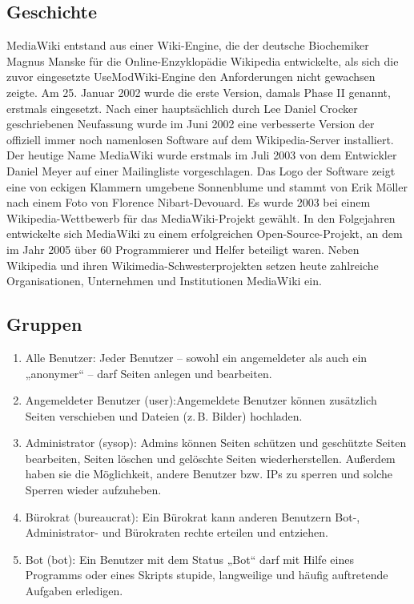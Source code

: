 \subsection{Geschichte}
MediaWiki entstand aus einer Wiki-Engine, die der deutsche Biochemiker Magnus Manske für die Online-Enzyklopädie Wikipedia entwickelte, als sich die zuvor eingesetzte UseModWiki-Engine den Anforderungen nicht gewachsen zeigte. Am 25. Januar 2002 wurde die erste Version, damals Phase II genannt, erstmals eingesetzt. Nach einer hauptsächlich durch Lee Daniel Crocker geschriebenen Neufassung wurde im Juni 2002 eine verbesserte Version der offiziell immer noch namenlosen Software auf dem Wikipedia-Server installiert. Der heutige Name MediaWiki wurde erstmals im Juli 2003 von dem Entwickler Daniel Meyer auf einer Mailingliste vorgeschlagen. Das Logo der Software zeigt eine von eckigen Klammern umgebene Sonnenblume und stammt von Erik Möller nach einem Foto von Florence Nibart-Devouard. Es wurde 2003 bei einem Wikipedia-Wettbewerb für das MediaWiki-Projekt gewählt. In den Folgejahren entwickelte sich MediaWiki zu einem erfolgreichen Open-Source-Projekt, an dem im Jahr 2005 über 60 Programmierer und Helfer beteiligt waren. Neben Wikipedia und ihren Wikimedia-Schwesterprojekten setzen heute zahlreiche Organisationen, Unternehmen und Institutionen MediaWiki ein.
\subsection{Gruppen}
\begin{enumerate}
	\item Alle Benutzer:
	Jeder Benutzer – sowohl ein angemeldeter als auch ein „anonymer“ – darf Seiten anlegen und bearbeiten.
	\item Angemeldeter Benutzer (user):Angemeldete Benutzer können zusätzlich Seiten verschieben und Dateien (z. B. Bilder) hochladen.
	\item Administrator (sysop): Admins können Seiten schützen und geschützte Seiten bearbeiten, Seiten löschen und gelöschte Seiten wiederherstellen. Außerdem haben sie die Möglichkeit, andere Benutzer bzw. IPs zu sperren und solche Sperren wieder aufzuheben.
	\item Bürokrat (bureaucrat): Ein Bürokrat kann anderen Benutzern Bot-, Administrator- und Bürokraten rechte erteilen und entziehen.
	\item Bot (bot): Ein Benutzer mit dem Status „Bot“ darf mit Hilfe eines Programms oder eines Skripts stupide, langweilige und häufig auftretende Aufgaben erledigen.
\end{enumerate}


